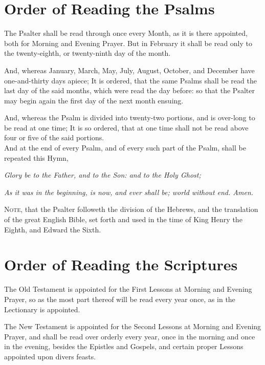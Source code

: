 {}

\section{Order of Reading the Psalms}

The Psalter shall be read through once every Month, as it is there appointed, both for Morning and Evening Prayer. But in February it shall be read only to the twenty-eighth, or twenty-ninth day of the month.

And, whereas January, March, May, July, August, October, and December have one-and-thirty days apiece; It is ordered, that the same Psalms shall be read the last day of the said months, which were read the day before: so that the Psalter may begin again the first day of the next month ensuing.

And, whereas the  Psalm is divided into twenty-two portions, and is over-long to be read at one time; It is so ordered, that at one time shall not be read above four or five of the said portions.\\

And at the end of every Psalm, and of every such part of the  Psalm, shall be repeated this Hymn,

\begin{center}
	\textit{Glory be to the Father, and to the Son: and to the Holy Ghost;}
	
	\textit{As it was in the beginning, is now, and ever shall be; world without end. Amen.}
\end{center}

\textsc{Note,} that the Psalter followeth the division of the Hebrews, and the translation of the great English Bible, set forth and used in the time of King Henry the Eighth, and Edward the Sixth.

\clearpage
\section{Order of Reading the Scriptures}

The Old Testament is appointed for the First Lessons at Morning and Evening Prayer, so as the most part thereof will be read every year once, as in the Lectionary is appointed.

    The New Testament is appointed for the Second Lessons at Morning and Evening Prayer, and shall be read over orderly every year, once in the morning and once in the evening, besides the Epistles and Gospels, and certain proper Lessons appointed upon divers feasts.\\

